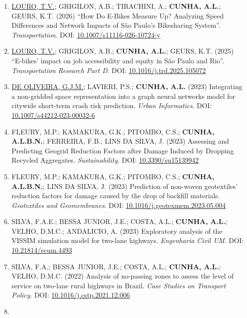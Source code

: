\documentclass[
  10pt,
  a4paper,
  DIV=11,
  numbers=noendperiod]{scrartcl}
\begin{document}
\begin{enumerate}
\def\labelenumi{\arabic{enumi}.}
\item
  \ul{LOURO, T.V.}; GRIGILON, A.B.; TIRACHINI, A.; \textbf{CUNHA, A.L.};
  GEURS, K.T. (2026) ``How Do E-Bikes Measure Up? Analyzing Speed
  Differences and Network Impacts of São Paulo's Bikesharing System''.
  \emph{Transportation}. DOI:
  \href{https://doi.org/10.1007/s11116-026-10724-y}{10.1007/s11116-026-10724-y}
\item
  \ul{LOURO, T.V.}; GRIGILON, A.B.; \textbf{CUNHA, A.L.}; GEURS, K.T.
  (2025) ``E-bikes' impact on job accessibility and equity in São Paulo
  and Rio''. \emph{Transportation Research Part D}. DOI:
  \href{https://doi.org/10.1016/j.trd.2025.105072}{10.1016/j.trd.2025.105072}
\item
  \ul{DE OLIVEIRA, G.J.M.}; LAVIERI, P.S.; \textbf{CUNHA, A.L.} (2023)
  Integrating a non-gridded space representation into a graph neural
  networks model for citywide short-term crash risk prediction.
  \emph{Urban Informatics}. DOI:
  \href{https://doi.org/10.1007/s44212-023-00032-6}{10.1007/s44212-023-00032-6}
\item
  FLEURY, M.P.; KAMAKURA, G.K.; PITOMBO, C.S.; \textbf{CUNHA, A.L.B.N.};
  FERREIRA, F.B.; LINS DA SILVA, J. (2023) Assessing and Predicting
  Geogrid Reduction Factors after Damage Induced by Dropping Recycled
  Aggregates. \emph{Sustainability}. DOI:
  \href{https://doi.org/10.3390/su15139942}{10.3390/su15139942}
\item
  FLEURY, M.P.; KAMAKURA, G.K.; PITOMBO, C.S.; \textbf{CUNHA, A.L.B.N.};
  LINS DA SILVA, J. (2023) Prediction of non-woven geotextiles'
  reduction factors for damage caused by the drop of backfill materials.
  \emph{Geotextiles and Geomembranes}. DOI:
  \href{https://doi.org/10.1016/j.geotexmem.2023.05.004}{10.1016/j.geotexmem.2023.05.004}
\item
  SILVA, F.A.E.; BESSA JUNIOR, J.E.; COSTA, A.L.; \textbf{CUNHA, A.L.};
  VELHO, D.M.C.; ANDALICIO, A. (2023) Exploratory analysis of the VISSIM
  simulation model for two-lane highways. \emph{Engenharia Civil UM}.
  DOI: \href{https://doi.org/10.21814/ecum.4493}{10.21814/ecum.4493}
\item
  SILVA, F.A.; BESSA JUNIOR, J.E.; COSTA, A.L.; \textbf{CUNHA, A.L.};
  VELHO, D.M.C. (2022) Analysis of no-passing zones to assess the level
  of service on two-lane rural highways in Brazil. \emph{Case Studies on
  Transport Policy}. DOI:
  \href{https://doi.org/10.1016/j.cstp.2021.12.006}{10.1016/j.cstp.2021.12.006}
\item

\end{enumerate}
\end{document}
